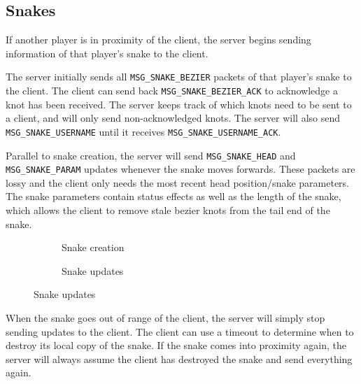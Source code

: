 \subsection{Snakes}

If another player is in  proximity  of  the  client,  the server begins sending
information of that player's snake to the client.

The server initially sends all \verb$MSG_SNAKE_BEZIER$ packets of that player's
snake  to  the  client. The client can send back \verb$MSG_SNAKE_BEZIER_ACK$ to
acknowledge a knot  has  been  received.  The server keeps track of which knots
need to be  sent  to  a  client, and will only send non-acknowledged knots. The
server   will   also   send   \verb$MSG_SNAKE_USERNAME$   until   it   receives
\verb$MSG_SNAKE_USERNAME_ACK$.

Parallel  to  snake  creation,  the server will send \verb$MSG_SNAKE_HEAD$  and
\verb$MSG_SNAKE_PARAM$ updates whenever the snake moves forwards. These packets
are  lossy  and  the  client  only  needs  the  most recent head position/snake
parameters. The snake  parameters  contain status effects as well as the length
of the snake, which allows the  client  to  remove  stale bezier knots from the
tail end of the snake.

\begin{figure}[H]
    \centering
    \begin{subfigure}{.48\linewidth}
        \centering
        
        \caption{Snake creation}
    \end{subfigure}
    \begin{subfigure}{.48\linewidth}
        \centering
        
        \caption{Snake updates}
    \end{subfigure}
\end{figure}

When  the  snake  goes out of range of the client, the server will simply  stop
sending updates to the client. The  client  can use a timeout to determine when
to  destroy  its  local  copy of the snake. If the snake comes  into  proximity
again, the server will always assume the client has  destroyed  the  snake  and
send everything again.

\begin{figure}[h]

\end{figure}

\vspace{1.5em}

\begin{figure}[h]

\end{figure}


